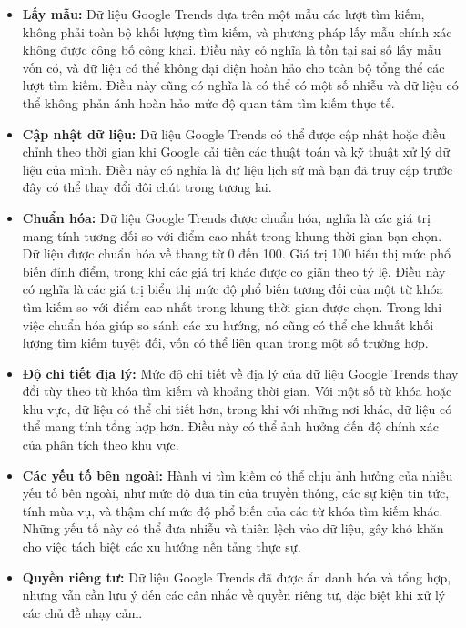 \begin{itemize}
  \item \textbf{Lấy mẫu:} Dữ liệu Google Trends dựa trên một mẫu các lượt tìm kiếm, không phải toàn bộ khối lượng tìm kiếm, và phương pháp lấy mẫu chính xác không được công bố công khai. Điều này có nghĩa là tồn tại sai số lấy mẫu vốn có, và dữ liệu có thể không đại diện hoàn hảo cho toàn bộ tổng thể các lượt tìm kiếm. Điều này cũng có nghĩa là có thể có một số nhiễu và dữ liệu có thể không phản ánh hoàn hảo mức độ quan tâm tìm kiếm thực tế.
  \item \textbf{Cập nhật dữ liệu:} Dữ liệu Google Trends có thể được cập nhật hoặc điều chỉnh theo thời gian khi Google cải tiến các thuật toán và kỹ thuật xử lý dữ liệu của mình. Điều này có nghĩa là dữ liệu lịch sử mà bạn đã truy cập trước đây có thể thay đổi đôi chút trong tương lai.
  \item \textbf{Chuẩn hóa:} Dữ liệu Google Trends được chuẩn hóa, nghĩa là các giá trị mang tính tương đối so với điểm cao nhất trong khung thời gian bạn chọn. Dữ liệu được chuẩn hóa về thang từ 0 đến 100. Giá trị 100 biểu thị mức phổ biến đỉnh điểm, trong khi các giá trị khác được co giãn theo tỷ lệ. Điều này có nghĩa là các giá trị biểu thị mức độ phổ biến tương đối của một từ khóa tìm kiếm so với điểm cao nhất trong khung thời gian được chọn. Trong khi việc chuẩn hóa giúp so sánh các xu hướng, nó cũng có thể che khuất khối lượng tìm kiếm tuyệt đối, vốn có thể liên quan trong một số trường hợp.
  \item \textbf{Độ chi tiết địa lý:} Mức độ chi tiết về địa lý của dữ liệu Google Trends thay đổi tùy theo từ khóa tìm kiếm và khoảng thời gian. Với một số từ khóa hoặc khu vực, dữ liệu có thể chi tiết hơn, trong khi với những nơi khác, dữ liệu có thể mang tính tổng hợp hơn. Điều này có thể ảnh hưởng đến độ chính xác của phân tích theo khu vực.
  \item \textbf{Các yếu tố bên ngoài:} Hành vi tìm kiếm có thể chịu ảnh hưởng của nhiều yếu tố bên ngoài, như mức độ đưa tin của truyền thông, các sự kiện tin tức, tính mùa vụ, và thậm chí mức độ phổ biến của các từ khóa tìm kiếm khác. Những yếu tố này có thể đưa nhiễu và thiên lệch vào dữ liệu, gây khó khăn cho việc tách biệt các xu hướng nền tảng thực sự.
  \item \textbf{Quyền riêng tư:} Dữ liệu Google Trends đã được ẩn danh hóa và tổng hợp, nhưng vẫn cần lưu ý đến các cân nhắc về quyền riêng tư, đặc biệt khi xử lý các chủ đề nhạy cảm.
\end{itemize}

